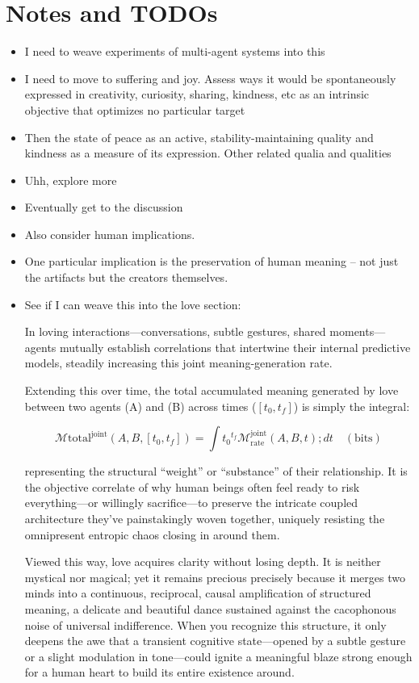 \section*{Notes and TODOs}

\begin{itemize}
    \item I need to weave experiments of multi-agent systems into this
    \item I need to move to suffering and joy. Assess ways it would be spontaneously expressed in creativity, curiosity, sharing, kindness, etc as an intrinsic objective that optimizes no particular target
    \item Then the state of peace as an active, stability-maintaining quality and kindness as a measure of its expression. Other related qualia and qualities
    \item Uhh, explore more
    \item Eventually get to the discussion
    \item Also consider human implications.
    \item One particular implication is the preservation of human meaning -- not just the artifacts but the creators themselves.
    \item See if I can weave this into the love section:
    
    In loving interactions---conversations, subtle gestures, shared moments---agents mutually establish correlations that intertwine their internal predictive models, steadily increasing this joint meaning-generation rate.
    
    Extending this over time, the total accumulated meaning generated by love between two agents (A) and (B) across times ($[t_0,t_f]$) is simply the integral:
    
    \[
    \mathcal{M}{\text{total}}^{\text{joint}}(A,B,[t_0,t_f]) = \int{t_0}^{t_f}\mathcal{M}_{\text{rate}}^{\text{joint}}(A,B,t);dt \quad (\text{bits})
    \]
    
    representing the structural ``weight'' or ``substance'' of their relationship. It is the objective correlate of why human beings often feel ready to risk everything---or willingly sacrifice---to preserve the intricate coupled architecture they've painstakingly woven together, uniquely resisting the omnipresent entropic chaos closing in around them.
    
    Viewed this way, love acquires clarity without losing depth. It is neither mystical nor magical; yet it remains precious precisely because it merges two minds into a continuous, reciprocal, causal amplification of structured meaning, a delicate and beautiful dance sustained against the cacophonous noise of universal indifference. When you recognize this structure, it only deepens the awe that a transient cognitive state---opened by a subtle gesture or a slight modulation in tone---could ignite a meaningful blaze strong enough for a human heart to build its entire existence around.
    

\end{itemize}
